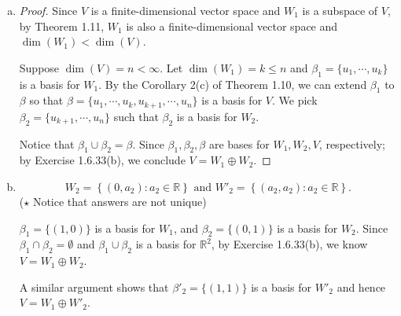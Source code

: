 \begin{Exercise}
\begin{enumerate}[(a)]
\item
\begin{proof}
Since $V$ is a finite-dimensional vector space and $W_1$ is a subspace of $V$, by Theorem 1.11, $W_1$ is also a finite-dimensional vector space and $\dim(W_1) < \dim(V)$.

Suppose $\dim(V) = n < \infty$. Let $\dim(W_1) = k \leq n$ and $\beta_1 = \{u_1, \cdots, u_k\}$ is a basis for $W_1$. By the Corollary 2(c) of Theorem 1.10, we can extend $\beta_1$ to $\beta$ so that $\beta = \{u_1,\cdots,u_k,u_{k+1},\cdots,u_n\}$ is a basis for $V$. We pick $\beta_2 = \{u_{k+1},\cdots,u_n\}$ such that $\beta_2$ is a basis for $W_2$.

Notice that $\beta_1\cup\beta_2 = \beta$. Since $\beta_1,\beta_2,\beta$ are bases for $W_1,W_2,V$, respectively; by Exercise 1.6.33(b), we conclude $V=W_1\oplus W_2$.
\end{proof}

\item
\begin{answer}
$$
W_2 = \left\{ (0,a_2):a_2\in\mathbb{R} \right\}\text{ and }
W'_2 = \left\{ (a_2,a_2):a_2\in\mathbb{R} \right\}.
$$
($\star$ Notice that answers are not unique)
\end{answer}
\begin{solution}
$\beta_1 = \{(1,0)\}$ is a basis for $W_1$, and $\beta_2 = \{(0,1)\}$ is a basis for $W_2$. Since $\beta_1\cap\beta_2 =\emptyset$ and $\beta_1\cup\beta_2$ is a basis for $\mathbb{R}^2$, by Exercise 1.6.33(b), we know $V=W_1\oplus W_2$. 

A similar argument shows that $\beta'_2 = \{(1,1)\}$ is a basis for $W'_2$ and hence $V=W_1\oplus W'_2$.
\end{solution}
\end{enumerate}
\end{Exercise}
